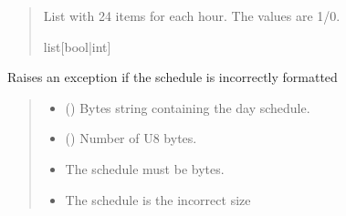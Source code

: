 \documentclass[letterpaper,10pt,english]{sphinxmanual}
\begin{document}
\begin{fulllineitems}
\begin{fulllineitems}
\begin{quote}
\begin{description}
\begin{itemize}
\end{itemize}

\sphinxAtStartPar
List with 24 items for each hour. The values are 1/0.

\sphinxAtStartPar
list{[}bool|int{]}

\end{description}\end{quote}

\end{fulllineitems}


\begin{fulllineitems}
\label{\detokenize{PodApi.Devices:PodApi.Devices.PodDevice_8229.Pod8229._Validate_Schedule}}
\pysigstartsignatures
{}
\pysigstopsignatures
\sphinxAtStartPar
Raises an exception if the schedule is incorrectly formatted
\begin{quote}\begin{description}
\begin{itemize}
\item {} 
\sphinxAtStartPar
{} () \textendash{} Bytes string containing the day schedule.

\item {} 
\sphinxAtStartPar
{} () \textendash{} Number of U8 bytes.

\end{itemize}

\begin{itemize}
\item {} 
\sphinxAtStartPar
{} \textendash{} The schedule must be bytes.

\item {} 
\sphinxAtStartPar
{} \textendash{} The schedule is the incorrect size


\end{itemize}
\end{description}
\end{quote}
\end{fulllineitems}
\end{fulllineitems}
\end{document}
